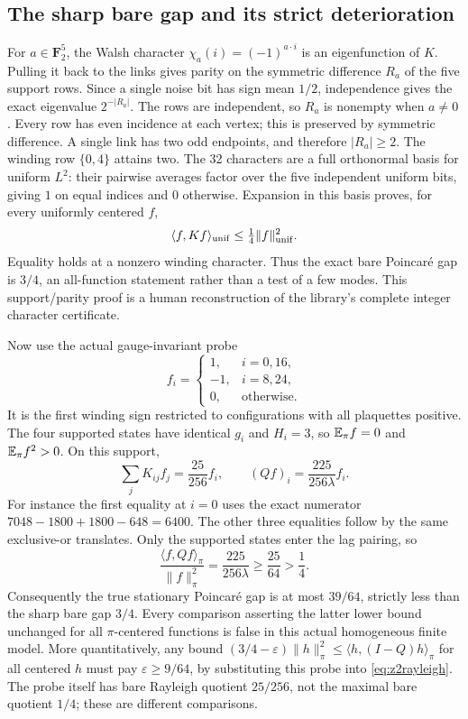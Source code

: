 \documentclass[11pt]{article}
\begin{document}
\subsection*{The sharp bare gap and its strict deterioration}
For $a\in\mathbf F_2^5$, the Walsh character
$\chi_a(i)=(-1)^{a\cdot i}$ is an eigenfunction of $K$. Pulling it
back to the links gives parity on the symmetric difference $R_a$ of
the five support rows. Since a single noise bit has sign mean $1/2$,
independence gives the exact eigenvalue $2^{-|R_a|}$. The rows are
independent, so $R_a$ is nonempty when $a\ne0$. Every row has even
incidence at each vertex; this is preserved by symmetric difference.
A single link has two odd endpoints, and therefore $|R_a|\geq2$.
The winding row $\{0,4\}$ attains two. The 32 characters are a full
orthonormal basis for uniform $L^2$: their pairwise averages factor
over the five independent uniform bits, giving $1$ on equal indices
and $0$ otherwise. Expansion in this basis proves, for every
uniformly centered $f$,
\[
 \langle f,Kf\rangle_{\rm unif}\leq\tfrac14\|f\|_{\rm unif}^2.
\]
Equality holds at a nonzero winding character. Thus the exact bare
Poincar\'e gap is $3/4$, an all-function statement rather than a
test of a few modes. This support/parity proof is a human
reconstruction of the library's complete integer character certificate.

Now use the actual gauge-invariant probe
\[
 f_i=\begin{cases}1,&i=0,16,\\-1,&i=8,24,\\0,&\text{otherwise}.
 \end{cases}
\]
It is the first winding sign restricted to configurations with all
plaquettes positive. The four supported states have identical $g_i$
and $H_i=3$, so $\mathbb E_\pi f=0$ and $\mathbb E_\pi f^2>0$. On this support,
\[
 \sum_jK_{ij}f_j=\frac{25}{256}f_i,
 \qquad (Qf)_i=\frac{225}{256\lambda}f_i.
\]
For instance the first equality at $i=0$ uses the exact numerator
$7048-1800+1800-648=6400$. The other three equalities follow by
the same exclusive-or translates. Only the supported states enter
the lag pairing, so
\begin{equation}\label{eq:z2rayleigh}
 \frac{\langle f,Qf\rangle_\pi}{\|f\|_\pi^2}
 =\frac{225}{256\lambda}\geq\frac{25}{64}>\frac14.
\end{equation}
Consequently the true stationary Poincar\'e gap is at most $39/64$,
strictly less than the sharp bare gap $3/4$. Every comparison asserting
the latter lower bound unchanged for all $\pi$-centered functions is
false in this actual homogeneous finite model. More quantitatively,
any bound $(3/4-\varepsilon)\|h\|_\pi^2\leq
\langle h,(I-Q)h\rangle_\pi$ for all centered $h$ must pay
$\varepsilon\geq9/64$, by substituting this probe into
\eqref{eq:z2rayleigh}. The probe itself has bare Rayleigh quotient
$25/256$, not the maximal bare quotient $1/4$; these are different
comparisons.
\end{document}
